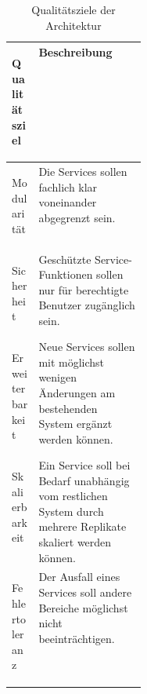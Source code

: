 \begin{table}[ht]
    \centering
    {
        \renewcommand{\arraystretch}{1.5}

        \begin{tabularx}{\linewidth}{
                >{\bfseries\raggedright\arraybackslash}p{0.20\linewidth}
                >{\raggedright\arraybackslash}X
        }
        \toprule
        Qualitätsziel & Beschreibung \\
        \midrule

        Modularität &
        Die Services sollen fachlich klar voneinander abgegrenzt sein. \\

        Sicherheit &
        Geschützte Service-Funktionen sollen nur für berechtigte Benutzer zugänglich sein. \\

        Erweiterbarkeit &
        Neue Services sollen mit möglichst wenigen Änderungen am bestehenden System ergänzt werden können. \\

        Skalierbarkeit &
        Ein Service soll bei Bedarf unabhängig vom restlichen System durch mehrere Replikate skaliert werden können. \\

        Fehlertoleranz &
        Der Ausfall eines Services soll andere Bereiche möglichst nicht
        beeinträchtigen. \\

        \bottomrule
        \end{tabularx}
    }

    \caption{Qualitätsziele der Architektur}
    \label{tab:qualitaetsziele}
\end{table}
